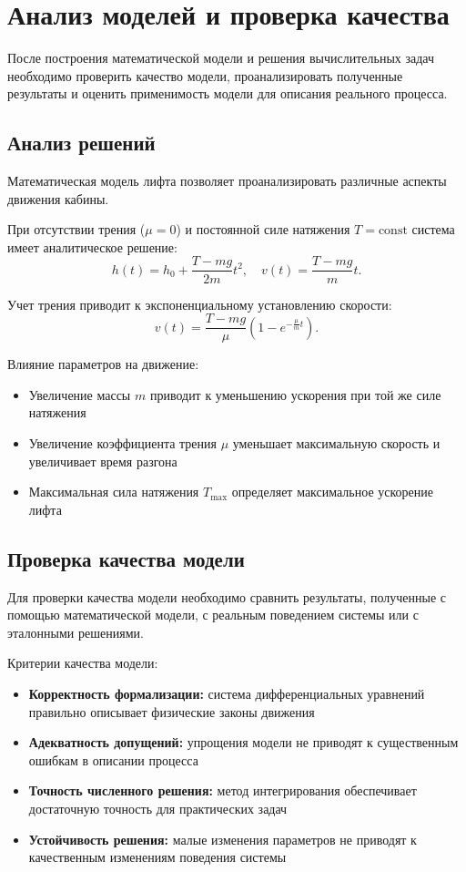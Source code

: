 \documentclass[a4paper, 14pt]{extarticle}
\begin{document}
\section{Анализ моделей и проверка качества}
После построения математической модели и решения вычислительных задач необходимо проверить качество модели, проанализировать полученные результаты и оценить применимость модели для описания реального процесса.

\subsection{Анализ решений}
Математическая модель лифта позволяет проанализировать различные аспекты движения кабины.

При отсутствии трения ($\mu = 0$) и постоянной силе натяжения $T = \text{const}$ система имеет аналитическое решение:
\[
h(t) = h_0 + \frac{T - mg}{2m}t^2, \quad v(t) = \frac{T - mg}{m}t.
\]

Учет трения приводит к экспоненциальному установлению скорости:
\[
v(t) = \frac{T - mg}{\mu}\left(1 - e^{-\frac{\mu}{m}t}\right).
\]

Влияние параметров на движение:
\begin{itemize}
  \item Увеличение массы $m$ приводит к уменьшению ускорения при той же силе натяжения
  \item Увеличение коэффициента трения $\mu$ уменьшает максимальную скорость и увеличивает время разгона
  \item Максимальная сила натяжения $T_{\max}$ определяет максимальное ускорение лифта
\end{itemize}

\subsection{Проверка качества модели}
Для проверки качества модели необходимо сравнить результаты, полученные с помощью математической модели, с реальным поведением системы или с эталонными решениями.

Критерии качества модели:
\begin{itemize}
  \item \textbf{Корректность формализации:} система дифференциальных уравнений правильно описывает физические законы движения
  \item \textbf{Адекватность допущений:} упрощения модели не приводят к существенным ошибкам в описании процесса
  \item \textbf{Точность численного решения:} метод интегрирования обеспечивает достаточную точность для практических задач
  \item \textbf{Устойчивость решения:} малые изменения параметров не приводят к качественным изменениям поведения системы
\end{itemize}
\end{document}

